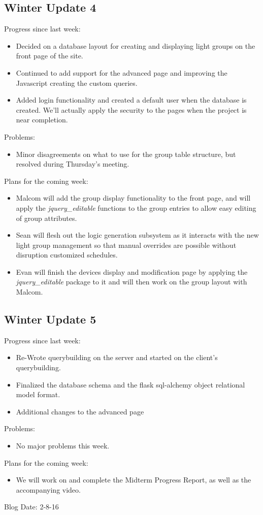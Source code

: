 \subsection{Winter Update 4}
Progress since last week:
\begin{itemize}
\item Decided on a database layout for creating and displaying light groups on the front page of the site.
\item Continued to add support for the advanced page and improving the Javascript creating the custom queries.
\item Added login functionality and created a default user when the database is created. We'll actually apply the security to the pages when the project is near completion.
\end{itemize}
Problems:
\begin{itemize}
\item Minor disagreements on what to use for the group table structure, but resolved during Thursday's meeting.
\end{itemize}
Plans for the coming week: 
\begin{itemize}
\item Malcom will add the group display functionality to the front page, and will apply the \textit{jquery\_editable} functions to the group entries to allow easy editing of group attributes.
\item Sean will flesh out the logic generation subsystem as it interacts with the new light group management so that manual overrides are possible without disruption customized schedules.
\item Evan will finish the devices display and modification page by applying the \textit{jquery\_editable} package to it and will then work on the group layout with Malcom.
\end{itemize}
\subsection{Winter Update 5}
Progress since last week:
\begin{itemize}
\item Re-Wrote querybuilding on the server and started on the client's querybuilding.
\item Finalized the database schema and the flask sql-alchemy object relational model format.
\item Additional changes to the advanced page
\end{itemize}
Problems:
\begin{itemize}
\item No major problems this week.
\end{itemize}
Plans for the coming week: 
\begin{itemize}
\item We will work on and complete the Midterm Progress Report, as well as the accompanying video. 
\end{itemize}
Blog Date: 2-8-16

